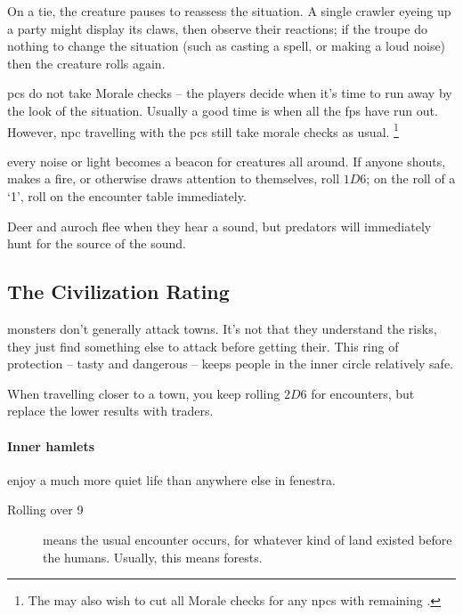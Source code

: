 \begin{multicols}{2}
On a tie, the creature pauses to reassess the situation.
A single \gls{crawler} eyeing up a party might display its claws, then observe their reactions; if the troupe do nothing to change the situation (such as casting a spell, or making a loud noise) then the creature rolls again.

\Glspl{pc} do not take Morale checks -- the players decide when it's time to run away by the look of the situation.
Usually a good time is when all the \glspl{fp} have run out.
%
However, \gls{npc} travelling with the \glspl{pc} still take morale checks as usual.%
\footnote{The  may also wish to cut all Morale checks for any \glspl{npc} with remaining .}%

every noise or light becomes a beacon for creatures all around.
If anyone shouts, makes a fire, or otherwise draws attention to themselves, roll $1D6$; on the roll of a `1', roll on the encounter table immediately.

Deer and auroch flee when they hear a sound, but predators will immediately hunt for the source of the sound.

\subsection{The Civilization Rating}
\label{civilizationRating}

\Glspl{monster} don't generally attack towns.
It's not that they understand the risks, they just find something else to attack before getting their.
This ring of protection -- tasty and dangerous -- keeps people in the inner circle relatively safe.

When travelling closer to a town, you keep rolling $2D6$ for encounters, but replace the lower results with traders.

\paragraph{Inner hamlets}
enjoy a much more quiet life than anywhere else in \gls{fenestra}.

\null
\begin{description}
  \item[Rolling over 9]
  means the usual encounter occurs, for whatever kind of land existed before the humans.
  Usually, this means forests.


\end{description}
\end{multicols}
